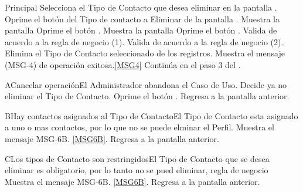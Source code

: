 	\begin{UCtrayectoria}{Principal}
			\UCpaso[\UCactor] Selecciona el Tipo de Contacto que desea eliminar en la pantalla .
			\UCpaso[\UCactor] Oprime el botón  del Tipo de contacto a Eliminar de la pantalla .
			\UCpaso Muestra la pantalla 
			\UCpaso [\UCactor] Oprime el botón .
			\UCpaso Muestra la pantalla 
			\UCpaso [\UCactor] Oprime el botón . 
                        \UCpaso Valida de acuerdo a la regla de negocio (1).  
			\UCpaso Valida de acuerdo a la regla de negocio (2).  
                        \UCpaso Elimina el Tipo de Contacto seleccionado de los registros.
			\UCpaso Muestra el mensaje (MSG-4) de operación exitosa.\ref{MSG4}
			\UCpaso Continúa en el paso 3 del .
	\end{UCtrayectoria}

		\begin{UCtrayectoriaA}{A}{Cancelar operación}{El Administrador abandona el Caso de Uso.}
			\UCpaso[\UCactor] Decide ya no eliminar el Tipo de Contacto.
			\UCpaso[\UCactor] Oprime el botón .
			\UCpaso Regresa a la pantalla anterior.
		\end{UCtrayectoriaA}

		\begin{UCtrayectoriaA}{B}{Hay contactos asignados al Tipo de Contacto}{El Tipo de Contacto esta asignado a uno o mas contactos, por lo que no se puede elminar el Perfil.}
			\UCpaso Muestra el mensaje MSG-6B. \ref{MSG6B}.
			\UCpaso Regresa a la pantalla anterior.
		\end{UCtrayectoriaA}	

		\begin{UCtrayectoriaA}{C}{Los tipos de Contacto son restringidos}{El Tipo de Contacto que se desea eliminar es obligatorio, por lo tanto no se pued eliminar, regla de negocio }
			\UCpaso Muestra el mensaje MSG-6B.  \ref{MSG6B}.
			\UCpaso Regresa a la pantalla anterior.
		\end{UCtrayectoriaA}	
		
